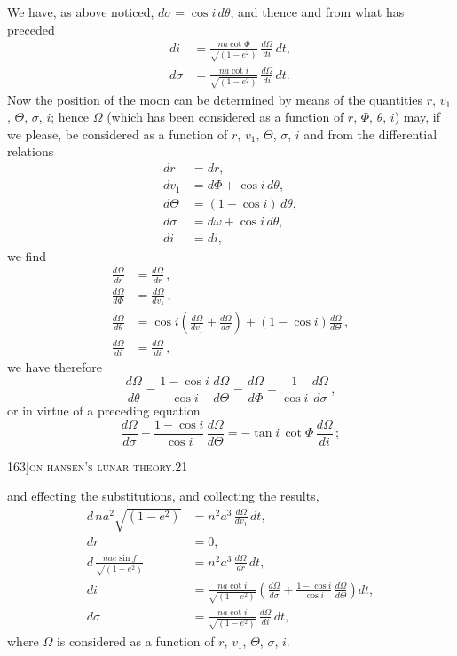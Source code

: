 \documentclass[11pt]{article}
\begin{document}
We have, as above noticed, $d\sigma = \cos i\,d\theta$, and thence and from what has preceded
\begin{align*}
di &= \frac{na\cot\Phi}{\sqrt{(1-e^{2})}}\,\frac{d\Omega}{di}\,dt,\\
d\sigma &= \frac{na\cot i}{\sqrt{(1-e^{2})}}\,\frac{d\Omega}{di}\,dt.
\end{align*}
Now the position of the moon can be determined by means of the quantities
$r$, $v_{1}$, $\Theta$, $\sigma$, $i$; hence $\Omega$ (which has been considered as a function of $r$, $\Phi$, $\theta$, $i$) may,
if we please, be considered as a function of $r$, $v_{1}$, $\Theta$, $\sigma$, $i$ and from the differential
relations
\begin{align*}
dr &= dr,\\
dv_{1} &= d\Phi + \cos i\,d\theta,\\
d\Theta &= (1 - \cos i)\,d\theta,\\
d\sigma &= d\omega + \cos i\,d\theta,\\
di &= di,
\end{align*}
we find
\begin{align*}
\frac{d\Omega}{dr} &= \frac{d\Omega}{dr}\,,\\
\frac{d\Omega}{d\Phi} &= \frac{d\Omega}{dv_{1}}\,,\\
\frac{d\Omega}{d\theta} &= \cos i\!\left(\frac{d\Omega}{dv_{1}} + \frac{d\Omega}{d\sigma}\right) + \left(1 - \cos i\right)\frac{d\Omega}{d\Theta}\,,\\
\frac{d\Omega}{di} &= \frac{d\Omega}{di}\,,
\end{align*}
we have therefore
\[
\frac{d\Omega}{d\theta} = \frac{1 - \cos i}{\cos i}\,\frac{d\Omega}{d\Theta} = \frac{d\Omega}{d\Phi} + \frac{1}{\cos i}\,\frac{d\Omega}{d\sigma}\,,
\]
or in virtue of a preceding equation
\[
\frac{d\Omega}{d\sigma} + \frac{1 - \cos i}{\cos i}\,\frac{d\Omega}{d\Theta} = -\tan i\,\cot\Phi\,\frac{d\Omega}{di}\,;
\]

\newpage

\begin{center}
\small 163]\hfill\textsc{on hansen's lunar theory.}\hfill\textsc{21}
\end{center}

\medskip

\noindent and effecting the substitutions, and collecting the results,
\begin{align*}
d\,na^{2}\sqrt{(1-e^{2})} &= n^{2}a^{3}\,\frac{d\Omega}{dv_{1}}\,dt,\\
dr &= 0,\\
d\,\frac{nae\sin f}{\sqrt{(1-e^{2})}} &= n^{2}a^{3}\,\frac{d\Omega}{dr}\,dt,\\
di &= \frac{na\cot i}{\sqrt{(1-e^{2})}}\!\left(\frac{d\Omega}{d\sigma} + \frac{1 - \cos i}{\cos i}\,\frac{d\Omega}{d\Theta}\right)dt,\\
d\sigma &= \frac{na\cot i}{\sqrt{(1-e^{2})}}\,\frac{d\Omega}{di}\,dt,
\end{align*}
where $\Omega$ is considered as a function of $r$, $v_{1}$, $\Theta$, $\sigma$, $i$.
\end{document}
